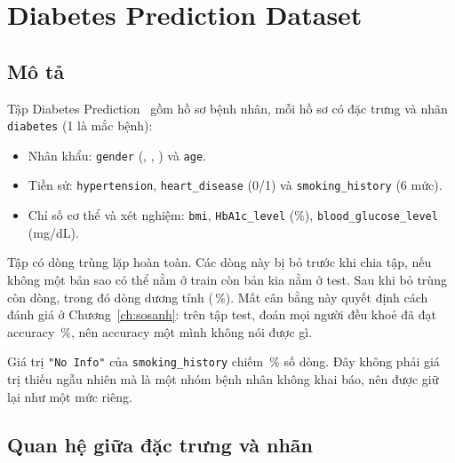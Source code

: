 \section{Diabetes Prediction Dataset}

\subsection{Mô tả}

Tập Diabetes Prediction~\cite{mustafa2023} gồm  hồ sơ bệnh nhân, mỗi hồ sơ có
 đặc trưng và nhãn \texttt{diabetes} (1 là mắc bệnh):

\begin{itemize}
  \item Nhân khẩu: \texttt{gender} (, ,
        ) và \texttt{age}.
  \item Tiền sử: \texttt{hypertension}, \texttt{heart\_disease} (0/1) và \texttt{smoking\_history} (6 mức).
  \item Chỉ số cơ thể và xét nghiệm: \texttt{bmi}, \texttt{HbA1c\_level} (\%), \texttt{blood\_glucose\_level} (mg/dL).
\end{itemize}

Tập có  dòng trùng lặp hoàn toàn. Các dòng này bị bỏ trước khi chia tập, nếu không một bản
sao có thể nằm ở train còn bản kia nằm ở test. Sau khi bỏ trùng còn  dòng, trong đó
 dòng dương tính (\,\%). Mất cân bằng này quyết định cách đánh giá
ở Chương~\ref{ch:sosanh}: trên tập test, đoán mọi người đều khoẻ đã đạt accuracy \,\%, nên accuracy
một mình không nói được gì.

\begin{table}[H]
  \centering
  \caption{Thống kê mô tả bốn đặc trưng số (sau khi bỏ trùng)}
  \label{tab:diabdesc}
  
\end{table}

Giá trị \texttt{"No Info"} của \texttt{smoking\_history} chiếm \,\% số dòng. Đây không phải
giá trị thiếu ngẫu nhiên mà là một nhóm bệnh nhân không khai báo, nên được giữ lại như một mức riêng.

\subsection{Quan hệ giữa đặc trưng và nhãn}

